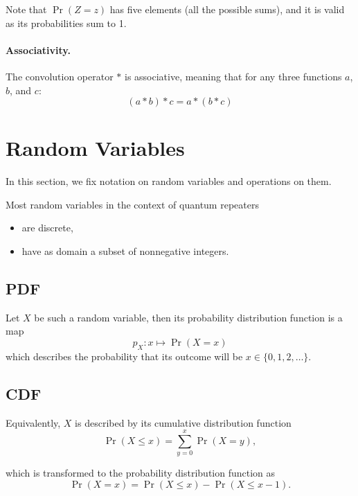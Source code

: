 \documentclass{masterthesis}
\begin{document}
Note that $\Pr(Z = z)$ has five elements (all the possible sums), and it is valid as its probabilities sum to 1.

\paragraph*{Associativity.}
\begin{samepage}
    The convolution operator \( * \) is associative, meaning that for any three functions \(a\), \(b\), and \(c\):
    \begin{equation}\label{eq:convolution_associativity} 
        (a * b) * c = a * (b * c)
    \end{equation}        
\end{samepage}

\section{Random Variables}\label{app:random_variables}

In this section, we fix notation on random variables and operations on them. 

Most random variables in the context of quantum repeaters
\begin{itemize}
    \item are discrete,
    \item have as domain a subset of nonnegative integers.
\end{itemize}

\subsection*{PDF}\label{paragraph:pdf}
Let $X$ be such a random variable, then its probability distribution function is a map
\begin{equation}
    p_X : x \mapsto \Pr(X = x)
\end{equation} 
which describes the probability that its outcome will be $x \in \{0, 1, 2, \ldots \}$.

\subsection*{CDF}\label{paragraph:cdf}
Equivalently, $X$ is described by its cumulative distribution function
\begin{equation}
    \Pr(X \leq x) = \sum_{y=0}^{x} \Pr(X = y),
\end{equation}

which is transformed to the probability distribution function as 
\begin{equation}
    \Pr(X = x) = \Pr(X \leq x) - \Pr(X \leq x - 1).
\end{equation}
\end{document}
